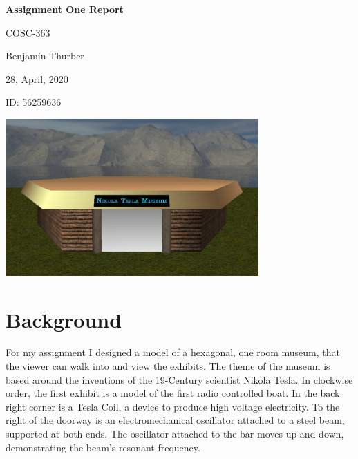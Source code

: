 \documentclass[10pt, oneside]{article}   	%
\begin{document}
\begin{center}
\LARGE{\textbf{Assignment One Report}}	%
\end{center}
\vspace{-1mm}
\begin{flushright}
\large{COSC-363}
\end{flushright}
\vspace{-11mm}
\large{Benjamin Thurber}			%
\vspace{0mm}
\begin{center}
\centerline{\large{28, April, 2020}}
\end{center}

\vspace{-10mm}
\begin{flushleft}
ID: 56259636

\end{flushleft}

\begin{center}
\vspace{2mm}
\includegraphics[height=6cm]{building.jpg}   %
\end{center}


\vspace{-3mm}
\normalsize

\section{Background}
For my assignment I designed a model of a hexagonal, one room museum, that the viewer can walk into and view the exhibits.  The theme of the museum is based around the inventions of the 19-Century scientist Nikola Tesla.  In clockwise order, the first exhibit is a model of the first radio controlled boat.  In the back right corner is a Tesla Coil, a device to produce high voltage electricity.  To the right of the doorway is an electromechanical oscillator attached to a steel beam, supported at both ends.  The oscillator attached to the bar moves up and down, demonstrating the beam's resonant frequency.
\end{document}
